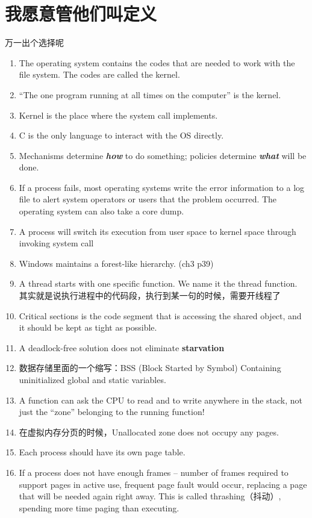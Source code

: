 \documentclass[]{report}
\begin{document}
	\section{我愿意管他们叫定义}
	万一出个选择呢\par
	\begin{enumerate}
		\item The operating system contains the codes that are needed to work with the file system. The codes are called the kernel.
		\item “The one program running at all times on the computer” is the kernel.
		\item Kernel is the place where the system call implements.
		\item C is the only language to interact with the OS directly.
		\item Mechanisms determine \textit{\textbf{how}} to do something; policies determine \textit{\textbf{what}} will be done.
		\item If a process fails, most operating systems write the error information to a log file to alert system operators or users that the problem occurred. The operating system can also take a core dump.
		\item A process will switch its execution from user space to kernel space through invoking system call
		\item Windows maintains a forest-like hierarchy. (ch3 p39)
		\item A thread starts with one specific function. We name it the thread function. 其实就是说执行进程中的代码段，执行到某一句的时候，需要开线程了
		\item Critical sections is the code segment that is accessing the shared object, and it should be kept as tight as possible.
		\item A deadlock-free solution does not eliminate \textbf{starvation}
		\item 数据存储里面的一个缩写：BSS (Block Started by Symbol) Containing uninitialized global and static variables.
		\item A function can ask the CPU to read and to write anywhere in the stack, not just the “zone” belonging to the running function!
		\item 在虚拟内存分页的时候，Unallocated zone does not occupy any pages.
		\item Each process should have its own page table.
		\item If a process does not have enough frames – number of frames required to support pages in active use, frequent page fault would occur, replacing a page that will be needed again right away. This is called thrashing（抖动）, spending more time paging than executing.

\end{enumerate}
\end{document}
